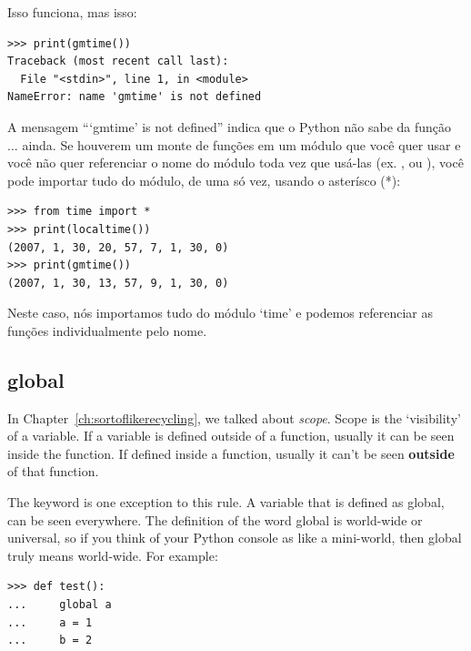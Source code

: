 \noindent
Isso funciona, mas isso:

\begin{listing}
\begin{verbatim}
>>> print(gmtime())
Traceback (most recent call last):
  File "<stdin>", line 1, in <module>
NameError: name 'gmtime' is not defined
\end{verbatim}
\end{listing}

A mensagem ```gmtime' is not defined'' indica que o Python não sabe da função $\ldots$ ainda. Se houverem um monte de funções em um módulo que você quer usar e você não quer referenciar o nome do módulo toda vez que usá-las (ex. , ou ), você pode importar tudo do módulo, de uma só vez, usando o asterísco (*):

\begin{listingignore}
\begin{verbatim}
>>> from time import *
>>> print(localtime())
(2007, 1, 30, 20, 57, 7, 1, 30, 0)
>>> print(gmtime())
(2007, 1, 30, 13, 57, 9, 1, 30, 0)
\end{verbatim}
\end{listingignore}

Neste caso, nós importamos tudo do módulo `time' e podemos referenciar as funções individualmente pelo nome.

\subsection*{global}

In Chapter~\ref{ch:sortoflikerecycling}, we talked about \emph{scope}.  Scope is the `visibility' of a variable. If a variable is defined outside of a function, usually it can be seen inside the function. If defined inside a function, usually it can't be seen \textbf{outside} of that function.
\par
The  keyword is one exception to this rule. A variable that is defined as global, can be seen everywhere. The definition of the word global is world-wide or universal, so if you think of your Python console as like a mini-world, then global truly means world-wide.  For example:

\begin{listing}
\begin{verbatim}
>>> def test():
...     global a
...     a = 1
...     b = 2
\end{verbatim}
\end{listing}

